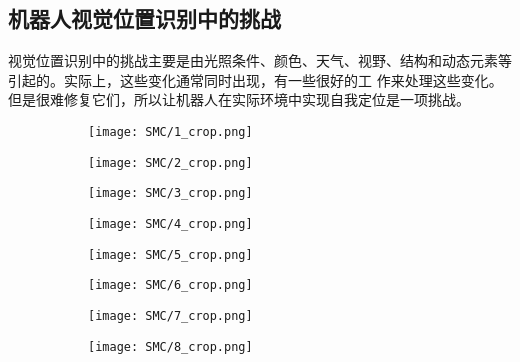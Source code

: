 \subsection{机器人视觉位置识别中的挑战}
视觉位置识别中的挑战主要是由光照条件、颜色、天气、视野、结构和动态元素等引起的。实际上，这些变化通常同时出现，有一些很好的工
作来处理这些变化。但是很难修复它们，所以让机器人在实际环境中实现自我定位是一项挑战。
\begin{figure}[h]
	\begin{center}
	\begin{subfigure}[b]{0.22\textwidth}
		\texttt{[image: SMC/1\_crop.png]}
		\caption{}
        \label{fig:DifferentConditiona}
	\end{subfigure} 
	\vspace*{4mm}
    \begin{subfigure}[b]{0.22\textwidth}    
		\texttt{[image: SMC/2\_crop.png]}
		\caption{}
        \label{fig:DifferentConditionb}    
    \end{subfigure} 
    \begin{subfigure}[b]{0.22\textwidth}    
		\texttt{[image: SMC/3\_crop.png]}
		\caption{}
    	\label{fig:DifferentConditionc}    
    \end{subfigure}
    \begin{subfigure}[b]{0.22\textwidth}    
		\texttt{[image: SMC/4\_crop.png]}
		\caption{}
    	\label{fig:DifferentConditiond}    
	\end{subfigure}
    \begin{subfigure}[b]{0.22\textwidth}    
		\texttt{[image: SMC/5\_crop.png]}
		\caption{}
    	\label{fig:DifferentConditione}    
	\end{subfigure}
	\vspace*{4mm}
    \begin{subfigure}[b]{0.22\textwidth}    
		\texttt{[image: SMC/6\_crop.png]}
		\caption{}
    	\label{fig:DifferentConditionf}    
    \end{subfigure}
    \begin{subfigure}[b]{0.22\textwidth}    
		\texttt{[image: SMC/7\_crop.png]}
		\caption{}
    	\label{fig:DifferentConditiong}    
    \end{subfigure} 
    \begin{subfigure}[b]{0.22\textwidth}    
		\texttt{[image: SMC/8\_crop.png]}
		\caption{}
    	\label{fig:DifferentConditionh}    
	\end{subfigure} 

\end{center}
\end{figure}
